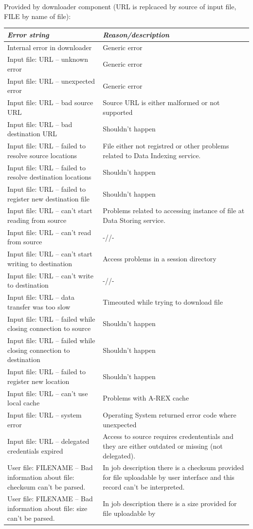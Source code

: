 \documentclass{article}                            %
\begin{document}
\medskip{}
Provided by downloader component (URL is replcaced by source of input
file, FILE by name of file):\\
\begin{longtable}{|p{5cm}|p{10cm}|}
\hline 
\emph{Error string}&
\emph{Reason/description}\tabularnewline
\hline 
Internal error in downloader&
Generic error \tabularnewline
\hline 
Input file: URL -- unknown error&
Generic error \tabularnewline
\hline 
Input file: URL -- unexpected error&
Generic error \tabularnewline
\hline 
Input file: URL -- bad source URL&
Source URL is either malformed or not supported\tabularnewline
\hline 
Input file: URL -- bad destination URL&
Shouldn't happen\tabularnewline
\hline 
Input file: URL -- failed to resolve source locations&
File either not registred or other problems related to Data Indexing
service.\tabularnewline
\hline 
Input file: URL -- failed to resolve destination locations&
Shouldn't happen\tabularnewline
\hline 
Input file: URL -- failed to register new destination file&
Shouldn't happen\tabularnewline
\hline 
Input file: URL -- can't start reading from source&
Problems related to accessing instance of file at Data Storing service.\tabularnewline
\hline 
Input file: URL -- can't read from source&
-//-\tabularnewline
\hline 
Input file: URL -- can't start writing to destination&
Access problems in a session directory\tabularnewline
\hline 
Input file: URL -- can't write to destination&
-//-\tabularnewline
\hline 
Input file: URL -- data transfer was too slow&
Timeouted while trying to download file\tabularnewline
\hline 
Input file: URL -- failed while closing connection to source&
Shouldn't happen\tabularnewline
\hline 
Input file: URL -- failed while closing connection to destination&
Shouldn't happen\tabularnewline
\hline 
Input file: URL -- failed to register new location&
Shouldn't happen\tabularnewline
\hline 
Input file: URL -- can't use local cache&
Problems with A-REX cache \tabularnewline
\hline 
Input file: URL -- system error&
Operating System returned error code where unexpected\tabularnewline
\hline 
Input file: URL -- delegated credentials expired&
Access to source requires credententials and they are either outdated
or missing (not delegated).\tabularnewline
\hline 
User file: FILENAME -- Bad information about file: checksum can't be
parsed.&
In job description there is a checksum provided for file uploadable
by user interface and this record can't be interpreted.\tabularnewline
\hline 
User file: FILENAME -- Bad information about file: size can't be parsed.&
In job description there is a size provided for file uploadable by

\end{longtable}
\end{document}
